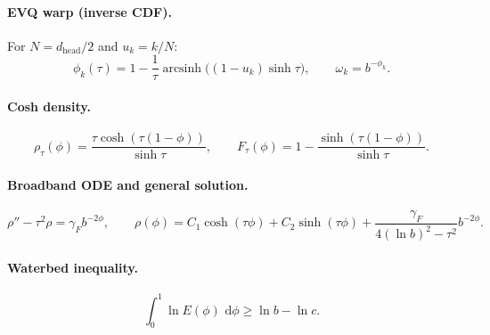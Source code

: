 \documentclass[11pt]{article}
\theoremstyle{plain}
\theoremstyle{definition}
\theoremstyle{remark}
\newcommand{\asinh}{\operatorname{arcsinh}}
\newcommand{\dd}{\,\mathrm{d}}
\begin{document}
\paragraph{EVQ warp (inverse CDF).}
For $N=d_{\mathrm{head}}/2$ and $u_k=k/N$:
\begin{equation}
\phi_k(\tau)=1-\frac{1}{\tau}\asinh\!\bigl((1-u_k)\sinh\tau\bigr),
\qquad
\omega_k=b^{-\phi_k}.
\end{equation}

\paragraph{Cosh density.}
\begin{equation}
\rho_\tau(\phi)=\frac{\tau\cosh(\tau(1-\phi))}{\sinh\tau},
\qquad
F_\tau(\phi)=1-\frac{\sinh(\tau(1-\phi))}{\sinh\tau}.
\end{equation}

\paragraph{Broadband ODE and general solution.}
\begin{equation}
\rho''-\tau^2\rho=\gamma_F b^{-2\phi},\qquad
\rho(\phi)=C_1\cosh(\tau\phi)+C_2\sinh(\tau\phi)+\frac{\gamma_F}{4(\ln b)^2-\tau^2}b^{-2\phi}.
\end{equation}

\paragraph{Waterbed inequality.}
\begin{equation}
\int_0^1 \ln E(\phi)\,\dd\phi \ge \ln b-\ln c.
\end{equation}
\end{document}
